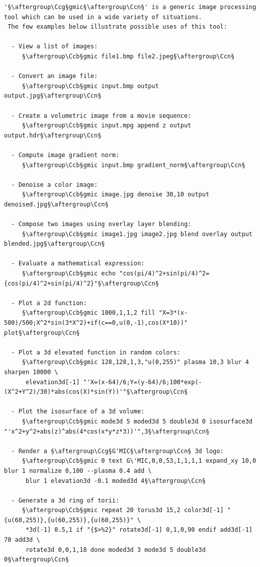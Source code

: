 \documentclass[a4paper,10.5pt,twoside]{book}
\def\Ccb{\color{cb}}
\def\Ccg{\color{cc}}
\def\Ccn{\color{black}}
\begin{document}
\begin{lstlisting}[escapechar=§]
 '§\aftergroup\Ccg§gmic§\aftergroup\Ccn§' is a generic image processing tool which can be used in a wide variety of situations. 
 The few examples below illustrate possible uses of this tool: 
 
  - View a list of images: 
     §\aftergroup\Ccb§gmic file1.bmp file2.jpeg§\aftergroup\Ccn§ 
 
  - Convert an image file: 
     §\aftergroup\Ccb§gmic input.bmp output output.jpg§\aftergroup\Ccn§ 
 
  - Create a volumetric image from a movie sequence: 
     §\aftergroup\Ccb§gmic input.mpg append z output output.hdr§\aftergroup\Ccn§ 
 
  - Compute image gradient norm: 
     §\aftergroup\Ccb§gmic input.bmp gradient_norm§\aftergroup\Ccn§ 
 
  - Denoise a color image: 
     §\aftergroup\Ccb§gmic image.jpg denoise 30,10 output denoised.jpg§\aftergroup\Ccn§ 
 
  - Compose two images using overlay layer blending: 
     §\aftergroup\Ccb§gmic image1.jpg image2.jpg blend overlay output blended.jpg§\aftergroup\Ccn§ 
 
  - Evaluate a mathematical expression: 
     §\aftergroup\Ccb§gmic echo "cos(pi/4)^2+sin(pi/4)^2={cos(pi/4)^2+sin(pi/4)^2}"§\aftergroup\Ccn§ 
 
  - Plot a 2d function: 
     §\aftergroup\Ccb§gmic 1000,1,1,2 fill "X=3*(x-500)/500;X^2*sin(3*X^2)+if(c==0,u(0,-1),cos(X*10))" plot§\aftergroup\Ccn§ 
 
  - Plot a 3d elevated function in random colors: 
     §\aftergroup\Ccb§gmic 128,128,1,3,"u(0,255)" plasma 10,3 blur 4 sharpen 10000 \
      elevation3d[-1] "'X=(x-64)/6;Y=(y-64)/6;100*exp(-(X^2+Y^2)/30)*abs(cos(X)*sin(Y))'"§\aftergroup\Ccn§ 
 
  - Plot the isosurface of a 3d volume: 
     §\aftergroup\Ccb§gmic mode3d 5 moded3d 5 double3d 0 isosurface3d "'x^2+y^2+abs(z)^abs(4*cos(x*y*z*3))'",3§\aftergroup\Ccn§ 
 
  - Render a §\aftergroup\Ccg§G'MIC§\aftergroup\Ccn§ 3d logo: 
     §\aftergroup\Ccb§gmic 0 text G\'MIC,0,0,53,1,1,1,1 expand_xy 10,0 blur 1 normalize 0,100 --plasma 0.4 add \
      blur 1 elevation3d -0.1 moded3d 4§\aftergroup\Ccn§ 
 
  - Generate a 3d ring of torii: 
     §\aftergroup\Ccb§gmic repeat 20 torus3d 15,2 color3d[-1] "{u(60,255)},{u(60,255)},{u(60,255)}" \
      *3d[-1] 0.5,1 if "{$>%2}" rotate3d[-1] 0,1,0,90 endif add3d[-1] 70 add3d \
      rotate3d 0,0,1,18 done moded3d 3 mode3d 5 double3d 0§\aftergroup\Ccn§ 
 

\end{lstlisting}
\end{document}
